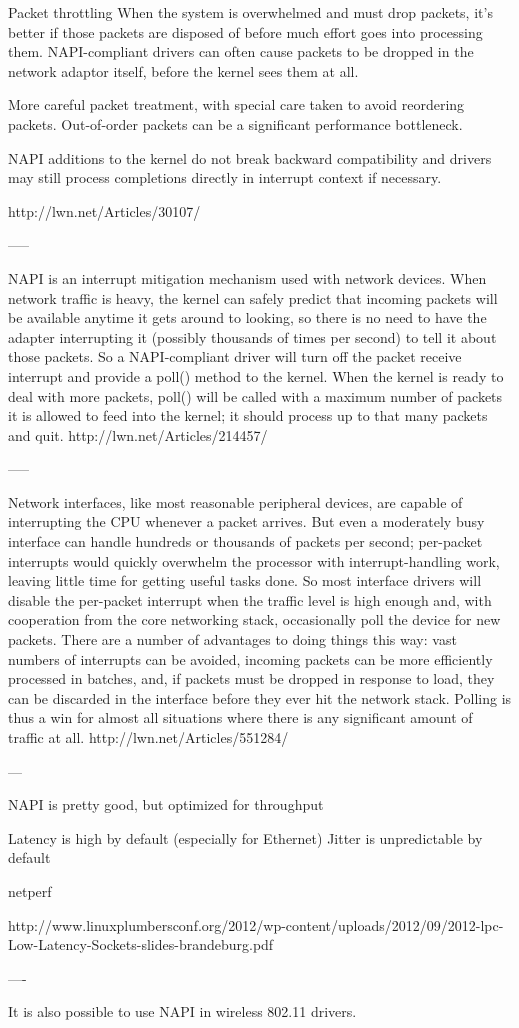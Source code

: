 Packet throttling 
    When the system is overwhelmed and must drop packets, it's better if those packets are disposed of before much effort goes into processing them. NAPI-compliant drivers can often cause packets to be dropped in the network adaptor itself, before the kernel sees them at all.

More careful packet treatment, with special care taken to avoid reordering packets. Out-of-order packets can be a significant performance bottleneck. 


NAPI additions to the kernel do not break backward compatibility and drivers may still process completions directly in interrupt context if necessary.

http://lwn.net/Articles/30107/

-----


NAPI is an interrupt mitigation mechanism used with network devices. When network traffic is heavy, the kernel can safely predict that incoming packets will be available anytime it gets around to looking, so there is no need to have the adapter interrupting it (possibly thousands of times per second) to tell it about those packets. So a NAPI-compliant driver will turn off the packet receive interrupt and provide a poll() method to the kernel. When the kernel is ready to deal with more packets, poll() will be called with a maximum number of packets it is allowed to feed into the kernel; it should process up to that many packets and quit.
http://lwn.net/Articles/214457/

-----

Network interfaces, like most reasonable peripheral devices, are capable of interrupting the CPU whenever a packet arrives. But even a moderately busy interface can handle hundreds or thousands of packets per second; per-packet interrupts would quickly overwhelm the processor with interrupt-handling work, leaving little time for getting useful tasks done. So most interface drivers will disable the per-packet interrupt when the traffic level is high enough and, with cooperation from the core networking stack, occasionally poll the device for new packets. There are a number of advantages to doing things this way: vast numbers of interrupts can be avoided, incoming packets can be more efficiently processed in batches, and, if packets must be dropped in response to load, they can be discarded in the interface before they ever hit the network stack. Polling is thus a win for almost all situations where there is any significant amount of traffic at all. 
http://lwn.net/Articles/551284/

---

NAPI is pretty good, but optimized for throughput

Latency is high by default (especially for Ethernet)
Jitter is unpredictable by default

netperf

http://www.linuxplumbersconf.org/2012/wp-content/uploads/2012/09/2012-lpc-Low-Latency-Sockets-slides-brandeburg.pdf

----

It is also possible to use NAPI in wireless 802.11 drivers.
